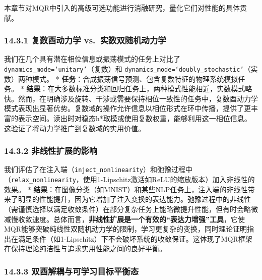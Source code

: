 \documentclass[
  12pt,
]{article}
\begin{document}
本章节对MQR中引入的高级可选功能进行消融研究，量化它们对性能的具体贡献。

\hypertarget{ux590dux6570ux9149ux52a8ux529bux5b66-vs.-ux5b9eux6570ux53ccux968fux673aux52a8ux529bux5b66}{%
\subsubsection{14.3.1 复数酉动力学
vs.~实数双随机动力学}\label{ux590dux6570ux9149ux52a8ux529bux5b66-vs.-ux5b9eux6570ux53ccux968fux673aux52a8ux529bux5b66}}

我们在几个具有潜在相位信息或振荡模式的任务上对比了
\texttt{dynamics\_mode=‘unitary’}（复数）和
\texttt{dynamics\_mode=‘doubly\_stochastic’}（实数）两种模式。 *
\textbf{任务}：合成振荡信号预测、包含复数特征的物理系统模拟任务。 *
\textbf{结果}：在大多数标准分类和回归任务上，两种模式性能相近，实数模式略快。然而，在明确涉及旋转、干涉或需要保持相位一致性的任务中，复数酉动力学模式表现出显著优势。复数域的操作允许信息以相位形式在环中传播，提供了更丰富的表示空间。读出时对稳态h*取模或使用复数权重，能够利用这一相位信息。这验证了将动力学推广到复数域的实用价值。

\hypertarget{ux975eux7ebfux6027ux6269ux5c55ux7684ux5f71ux54cd}{%
\subsubsection{14.3.2
非线性扩展的影响}\label{ux975eux7ebfux6027ux6269ux5c55ux7684ux5f71ux54cd}}

我们评估了在注入端（\texttt{inject\_nonlinearity}）和弛豫过程中（\texttt{relax\_nonlinearity}，使用1-Lipschitz激活如ReLU的缩放版本）加入非线性的效果。
*
\textbf{结果}：在图像分类（如MNIST）和某些NLP任务上，注入端的非线性带来了明显的性能提升，因为它增加了注入变换的表达能力。弛豫过程中的非线性（需谨慎选择以满足收敛条件）在部分复杂任务上能略微提升性能，但有时会略微减慢收敛速度。总体而言，\textbf{非线性扩展是一个有效的``表达力增强''工具}，它使MQR能够突破纯线性双随机动力学的限制，学习更复杂的变换，同时理论证明指出在满足条件（如1-Lipschitz）下不会破坏系统的收敛保证。这体现了MQR框架在保持理论纯洁性与追求实用性能之间的良好平衡。

\hypertarget{ux53ccux9149ux89e3ux8026ux4e0eux53efux5b66ux4e60ux76eeux6807ux5e73ux8861ux6001}{%
\subsubsection{14.3.3
双酉解耦与可学习目标平衡态}\label{ux53ccux9149ux89e3ux8026ux4e0eux53efux5b66ux4e60ux76eeux6807ux5e73ux8861ux6001}}
\end{document}
